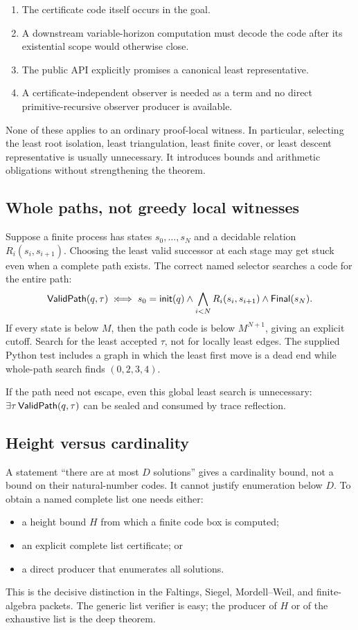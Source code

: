 \begin{enumerate}[label=(S\arabic*)]
\item The certificate code itself occurs in the goal.
\item A downstream variable-horizon computation must decode the code after its
      existential scope would otherwise close.
\item The public API explicitly promises a canonical least representative.
\item A certificate-independent observer is needed as a term and no direct
      primitive-recursive observer producer is available.
\end{enumerate}

None of these applies to an ordinary proof-local witness.  In particular,
selecting the least root isolation, least triangulation, least finite cover, or
least descent representative is usually unnecessary.  It introduces bounds
and arithmetic obligations without strengthening the theorem.

\subsection{Whole paths, not greedy local witnesses}

Suppose a finite process has states \(s_0,\ldots,s_N\) and a decidable relation
\(R_i(s_i,s_{i+1})\).  Choosing the least valid successor at each stage may get
stuck even when a complete path exists.  The correct named selector searches a
code for the entire path:
\[
 \mathsf{ValidPath}(q,\tau)\;:\!\Longleftrightarrow\;
 s_0=\mathsf{init}(q)\wedge
 \bigwedge_{i<N}R_i(s_i,s_{i+1})\wedge
 \mathsf{Final}(s_N).
\]
If every state is below \(M\), then the path code is below \(M^{N+1}\), giving
an explicit cutoff.  Search for the least accepted \(\tau\), not for locally
least edges.  The supplied Python test includes a graph in which the least
first move is a dead end while whole-path search finds \((0,2,3,4)\).

If the path need not escape, even this global least search is unnecessary:
\(\exists\tau\,\mathsf{ValidPath}(q,\tau)\) can be sealed and consumed by trace
reflection.

\subsection{Height versus cardinality}

A statement ``there are at most \(D\) solutions'' gives a cardinality bound,
not a bound on their natural-number codes.  It cannot justify enumeration
below \(D\).  To obtain a named complete list one needs either:
\begin{itemize}
\item a height bound \(H\) from which a finite code box is computed;
\item an explicit complete list certificate; or
\item a direct producer that enumerates all solutions.
\end{itemize}
This is the decisive distinction in the Faltings, Siegel, Mordell--Weil, and
finite-algebra packets.  The generic list verifier is easy; the producer of
\(H\) or of the exhaustive list is the deep theorem.


